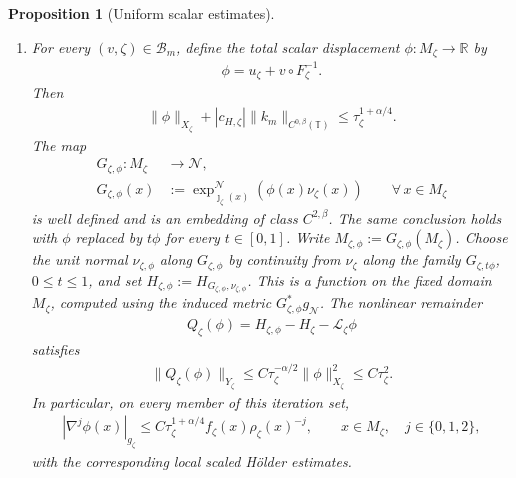 \documentclass[a4paper,11pt,oneside,reqno]{amsart}
\numberwithin{equation}{section}
\newtheorem{proposition}[theorem]{Proposition}
\theoremstyle{definition}
\begin{document}
\begin{proposition}[Uniform scalar estimates]
\begin{enumerate}
        \item For every $(v,\zeta)\in\mathcal{B}_m$, define
            the total scalar displacement $\phi:M_\zeta\to\mathbb R$ by
            \begin{align}
                \label{eq:s4-full-scalar-correction}
                \phi=u_\zeta+v\circ F_\zeta^{-1}.
            \end{align}
            Then
            \begin{align}
                \label{eq:s4-full-ball-bound}
                \|\phi\|_{X_\zeta}
                +|c_{H,\zeta}|\|k_m\|_{C^{0,\beta}(\mathbb{T})}
                \leq\tau_\zeta^{1+\alpha/4}.
            \end{align}
            The map
            \begin{align*}
                G_{\zeta,\phi}:M_\zeta&\rightarrow\mathcal N,\\
                G_{\zeta,\phi}(x)
                &:=\exp_{\jmath_\zeta(x)}^{\mathcal N}
                    (\phi(x)\nu_\zeta(x))
                \qquad\forall\,x\in M_\zeta
            \end{align*}
            is well defined and is an embedding of class
            $C^{2,\beta}$. The same conclusion holds with
            $\phi$ replaced by $t\phi$ for every $t\in[0,1]$.
            Write
            $M_{\zeta,\phi}:=G_{\zeta,\phi}(M_\zeta)$.
            Choose the unit normal $\nu_{\zeta,\phi}$ along
            $G_{\zeta,\phi}$ by continuity from $\nu_\zeta$
            along the family $G_{\zeta,t\phi}$, $0\leq t\leq1$,
            and set
            $H_{\zeta,\phi}:=H_{G_{\zeta,\phi},\nu_{\zeta,\phi}}$.
            This is a function on the fixed domain $M_\zeta$,
            computed using the induced metric
            $G_{\zeta,\phi}^*g_{\mathcal N}$.
            The nonlinear remainder
            \begin{align}
                \label{eq:s4-Q-definition}
                Q_\zeta(\phi)=H_{\zeta,\phi}-H_\zeta-\mathcal{L}_\zeta\phi
            \end{align}
            satisfies
            \begin{align}
                \label{eq:s4-scalar-quadratic}
                \|Q_\zeta(\phi)\|_{Y_\zeta}
                \leq C\tau_\zeta^{-\alpha/2}\|\phi\|_{X_\zeta}^2
                \leq C\tau_\zeta^2.
            \end{align}
            In particular, on every member of this iteration set,
            \begin{align}
                \label{eq:s4-scalar-two-jet}
                |\nabla^j\phi(x)|_{g_\zeta}\leq
                C\tau_\zeta^{1+\alpha/4}f_\zeta(x)\rho_\zeta(x)^{-j},
                \qquad x\in M_\zeta,\quad j\in\{0,1,2\},
            \end{align}
            with the corresponding local scaled H\"older estimates.
    \end{enumerate}
\end{proposition}
\end{document}

